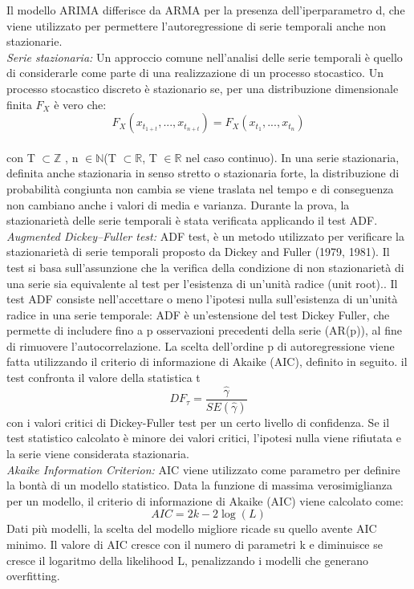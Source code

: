 \documentclass[10pt,journal,compsoc]{IEEEtran}
\begin{document}
Il modello ARIMA differisce da ARMA per la presenza dell'iperparametro d, che viene utilizzato per permettere l'autoregressione di serie temporali anche non stazionarie.\\
\emph{Serie stazionaria:} Un approccio comune nell’analisi delle serie temporali è quello di considerarle come parte di una realizzazione di un processo stocastico.
Un processo stocastico discreto è stazionario se, per una distribuzione dimensionale finita \(F_X\) è vero che:
\[F_X(x_{t_{1+t}},...,x_{t_{n+t}}) = F_X(x_{t_1},...,x_{t_n}) \tag{14}\] \\
con  T \(\subset \mathbb{Z}\) , n \(\in \mathbb{N}\)(T \(\subset \mathbb{R}\), T \(\in \mathbb{R}\) nel caso continuo). 
\cite{stocastic}
In una serie stazionaria, definita anche stazionaria in senso stretto o stazionaria forte, la distribuzione di probabilità congiunta non cambia se viene traslata nel tempo e di conseguenza non cambiano anche i valori di media e varianza.
Durante la prova, la stazionarietà delle serie temporali è stata verificata applicando il test ADF.\\
\emph{Augmented Dickey–Fuller test:} ADF test, è un metodo utilizzato per verificare la stazionarietà di serie temporali proposto da Dickey and Fuller (1979, 1981). Il test si basa sull'assunzione che la verifica della condizione di non stazionarietà di una serie sia  equivalente al test per l’esistenza di un’unità radice (unit root).\cite{adf}. Il test ADF consiste nell’accettare o meno l’ipotesi nulla sull’esistenza di un’unità radice in una serie temporale:
ADF è un'estensione del test Dickey Fuller, che permette di includere fino a p osservazioni precedenti della serie (AR(p)), al fine di rimuovere l’autocorrelazione. La scelta dell’ordine p di autoregressione viene fatta utilizzando il criterio di informazione di Akaike (AIC), definito in seguito.
il test confronta  il valore della statistica t
\[DF_\tau = \frac{\widehat{\gamma}}{SE(\widehat{\gamma})}\tag{15}\]
con i valori critici di Dickey-Fuller test per un certo livello di confidenza. Se il test statistico calcolato è minore dei valori critici, l’ipotesi nulla viene rifiutata e la serie viene considerata stazionaria.\\
\emph{Akaike Information Criterion:}
AIC viene utilizzato come parametro per definire la bontà di un modello statistico. Data la funzione di massima verosimiglianza per un modello, il criterio di informazione di Akaike (AIC) viene calcolato come:
\[AIC = 2k - 2 \log(L)\tag{16}\]
Dati più modelli, la scelta del modello migliore ricade su quello avente AIC minimo. Il valore di AIC cresce con il numero di parametri k e diminuisce se cresce il logaritmo della likelihood L, penalizzando i modelli che generano overfitting.\\\\
\end{document}
